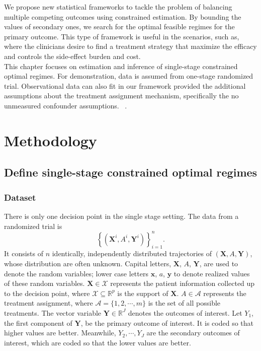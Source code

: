 \documentclass[12pt]{article}
\newcommand{\bs}{ \boldsymbol}
\newcommand{\mb}{\mathbb}
\newcommand{\ml}{\mathcal}
\newcommand{\lt}{\left}
\newcommand{\rt}{\right}
\begin{document}
We propose new statistical frameworks to tackle the problem of balancing multiple competing outcomes using constrained estimation. By bounding the values of secondary ones, we search for the optimal feasible regimes for the primary outcome. This type of framework is useful in the scenarios, such as, where the clinicians desire to find a treatment strategy that maximize the efficacy and controls the side-effect burden and cost. \\

This chapter focuses on estimation and inference of single-stage constrained optimal regimes. For demonstration, data is assumed from one-stage randomized trial. Observational data can also fit in our framework provided the additional assumptions about the treatment assignment mechanism, specifically the no unmeasured confounder assumptions. ~\cite{Chakraborty2013}.

\section{Methodology}
\subsection{Define single-stage constrained optimal regimes}
\subsubsection{Dataset} 
There is only one decision point in the single stage setting. The data from a randomized trial is 
$$\lt\{\lt(\bs{X}^i, A^i, \bs{Y}^i\rt)\rt\}_{i=1}^n.$$ 
It consists of $n$  identically, independently distributed trajectories of $\lt(\bs{X}, A, \bs{Y}\rt)$, whose distribution are often unknown. Capital letters, $\bs{X}$, $A$, $\bs{Y}$, are used to denote the random variables; lower case letters $\bs{x}$, $a$, $\bs{y}$ to denote realized values of these random variables.  $\bs{X} \in \bs{\ml{X}}$ represents the patient information collected up to the decision point, where $\bs{\ml{X}} \subseteq \mb{R}^{p}$ is the support of $\bs{X}$. $A \in \ml{A}$ represents the treatment assignment, where $\ml{A} = \{1,2, \cdots, m\}$ is the set of all possible treatments. The vector variable $\bs{Y} \in \mb{R}^J$ denotes the outcomes of interest. Let $Y_1$, the first component of $\bs{Y}$, be the primary outcome of interest. It is coded so that higher values are better. Meanwhile, $Y_2, \cdots, Y_J$ are the secondary outcomes of interest, which are coded so that the lower values are better. 
\end{document}
